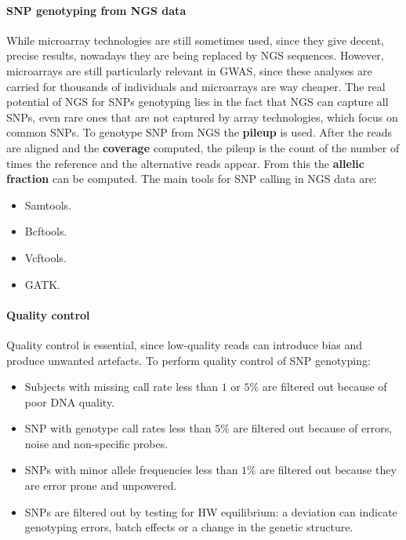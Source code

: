 			\paragraph{SNP genotyping from NGS data}
			While microarray technologies are still sometimes used, since they give decent, precise results, nowadays they are being replaced by NGS sequences.
			However, microarrays are still particularly relevant in GWAS, since these analyses are carried for thousands of individuals and microarrays are way cheaper.
			The real potential of NGS for SNPs genotyping lies in the fact that NGS can capture all SNPs, even rare ones that are not captured by array technologies, which focus on common SNPs.
			To genotype SNP from NGS the \textbf{pileup} is used.
			After the reads are aligned and the \textbf{coverage} computed, the pileup is the count of the number of times the reference and the alternative reads appear.
			From this the \textbf{allelic fraction} can be computed.
			The main tools for SNP calling in NGS data are:

			\begin{multicols}{4}
				\begin{itemize}
					\item Samtools.
					\item  Bcftools.
					\item  Vcftools.
					\item  GATK.
				\end{itemize}
			\end{multicols}

			\paragraph{Quality control}
			Quality control is essential, since low-quality reads can introduce bias and produce unwanted artefacts.
			To perform quality control of SNP genotyping:

			\begin{multicols}{2}
				\begin{itemize}
					\item Subjects with missing call rate less than $1$ or $5\%$ are filtered out because of poor DNA quality.
					\item SNP with genotype call rates less than $5\%$ are filtered out because of errors, noise and non-specific probes.
					\item SNPs with minor allele frequencies less than $1\%$ are filtered out because they are error prone and unpowered.
					\item SNPs are filtered out by testing for HW equilibrium: a deviation can indicate genotyping errors, batch effects or a change in the genetic structure.
				\end{itemize}
			\end{multicols}

